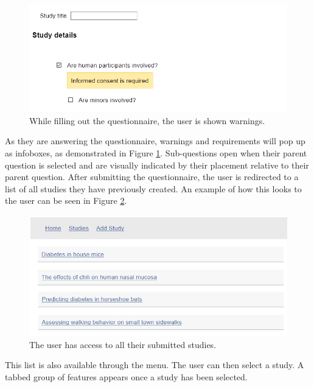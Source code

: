 \documentclass[10pt]{article}
\begin{document}
\begin{figure}[H]
\centering
	\includegraphics[width=1\textwidth]{img/filloutstudy.png}
	\caption{While filling out the questionnaire, the user is shown warnings.}
	\label{fig:filloutstudy}
\end{figure}

As they are answering the questionnaire, warnings and requirements will pop up as infoboxes, as demonstrated in Figure \ref{fig:filloutstudy}. Sub-questions open when their parent question is selected and are visually indicated by their placement relative to their parent question. After submitting the questionnaire, the user is redirected to a list of all studies they have previously created. An example of how this looks to the user can be seen in Figure \ref{fig:studylist}.\\

\begin{figure}[H]
\centering
	\includegraphics[width=1\textwidth]{img/studylist.png}
	\caption{The user has access to all their submitted studies.}
	\label{fig:studylist}
\end{figure}

This list is also available through the menu. The user can then select a study. A tabbed group of features appears once a study has been selected.\\
\end{document}
